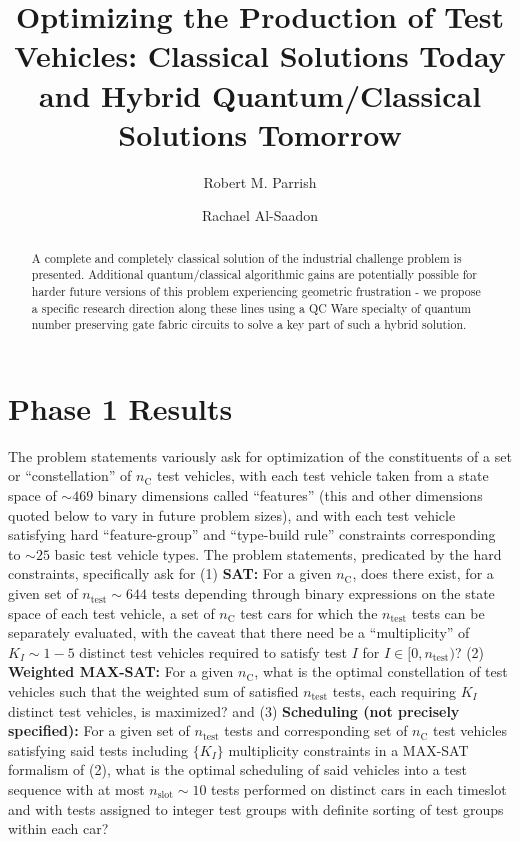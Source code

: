 \documentclass[aps,pra,twocolumn,superscriptaddress,groupedaddress]{revtex4}  %
\begin{document}

\title{
Optimizing the Production of Test Vehicles: Classical Solutions Today and Hybrid Quantum/Classical Solutions Tomorrow
}

\author{Robert M. Parrish}
\author{Rachael Al-Saadon}


\begin{abstract} 
A complete and completely classical solution of the industrial challenge problem
is presented.  Additional quantum/classical algorithmic gains are potentially
possible for harder future versions
of this problem experiencing geometric frustration - we propose a specific
research direction along these lines using a QC Ware specialty of quantum number
preserving gate fabric circuits to solve a key part of such a hybrid solution.
\end{abstract}

\maketitle

\section{Phase 1 Results}

The problem statements variously ask for optimization of the constituents of a
set or ``constellation'' of $n_{\mathrm{C}}$ test vehicles, with each test
vehicle taken from a state space of $\sim 469$ binary dimensions called
``features'' (this and other dimensions quoted below to vary in future problem
sizes), and with each test vehicle satisfying hard ``feature-group'' and
``type-build rule'' constraints corresponding to $\sim 25$ basic test vehicle
types. The problem statements, predicated by the hard constraints,
specifically ask for (1) \textbf{SAT:} For a given $n_{\mathrm{C}}$, does there
exist, for a given set of $n_{\mathrm{test}} \sim 644$ tests depending through
binary expressions on the state space of each test vehicle, a set of
$n_{\mathrm{C}}$ test cars for which the $n_{\mathrm{test}}$ tests can be
separately evaluated, with the caveat that there need be a ``multiplicity'' of $K_I \sim 1-5$ distinct
test vehicles required to satisfy test $I$ for $I \in [0, n_{\mathrm{test}})$?
(2) \textbf{Weighted MAX-SAT:} For a given $n_{\mathrm{C}}$, what is the optimal
constellation of test vehicles such that the weighted sum of satisfied
$n_{\mathrm{test}}$ tests, each requiring $K_I$ distinct test vehicles, is
maximized? and (3) \textbf{Scheduling (not precisely specified):} For a given
set of $n_{\mathrm{test}}$ tests and corresponding set of $n_{\mathrm{C}}$ test
vehicles satisfying said tests including $\{ K_I \}$ multiplicity constraints in
a MAX-SAT formalism of (2), what is the optimal scheduling of said vehicles into
a test sequence with at most $n_{\mathrm{slot}} \sim 10$ tests performed on
distinct cars in each timeslot and with tests assigned to integer test groups
with definite sorting of test groups within each car?
\end{document}
